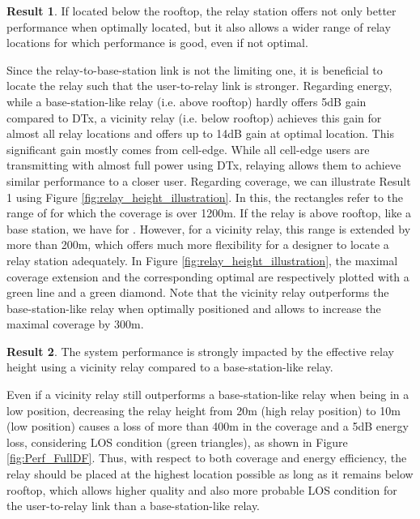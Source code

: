 \documentclass[journal]{IEEEtran}
\theoremstyle{definition}
\newtheorem{result}{Result}
\begin{document}
\vspace*{-5pt}
\begin{result}
If located below the rooftop, the relay station offers not only better performance when optimally located, but it also allows a wider range of relay locations for which performance is good, even if not optimal.
\end{result} \vspace*{-5pt} \noindent
Since the relay-to-base-station link  is not the limiting one, it is beneficial to locate the relay such that the user-to-relay link  is stronger. Regarding energy, while a base-station-like relay (i.e. above rooftop) hardly offers 5dB gain compared to DTx, a vicinity relay (i.e. below rooftop) achieves this gain for almost all relay locations and offers up to 14dB gain at optimal location. This significant gain mostly comes from cell-edge. While all cell-edge users are transmitting with almost full power using DTx, relaying allows them to achieve similar performance to a closer user.
Regarding coverage, we can illustrate Result 1 using Figure \ref{fig:relay_height_illustration}. 
In this, the rectangles refer to the range of  for which the coverage is over 1200m. If the relay is above rooftop, like a base station, we have  for . However, for a vicinity relay, this range is extended by more than 200m, which offers much more flexibility for a designer to locate a relay station adequately.
In Figure \ref{fig:relay_height_illustration}, the maximal coverage extension and the corresponding optimal  are respectively plotted with a green line and a green diamond. Note that the vicinity relay outperforms the base-station-like relay when optimally positioned and allows to increase the maximal coverage by 300m.

\vspace*{-5pt}\begin{result}
The system performance is strongly impacted by the effective relay height using a vicinity relay compared to a base-station-like relay. 
\end{result} \vspace*{-5pt} \noindent
Even if a vicinity relay still outperforms a base-station-like relay when being in a low position, decreasing the relay height from 20m (high relay position) to 10m (low position) causes a loss of more than 400m in the coverage and a 5dB energy loss, considering LOS condition (green triangles), as shown in Figure \ref{fig:Perf_FullDF}. Thus, with respect to both coverage and energy efficiency, the relay should be placed at the highest location possible as long as it remains below rooftop, which allows higher quality and also more probable LOS condition for the user-to-relay link than a base-station-like relay.
\end{document}
